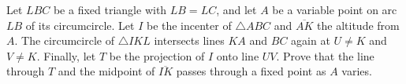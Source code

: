 Let $LBC$ be a fixed triangle with $LB=LC$, and let $A$ be a variable point on arc $LB$ of its circumcircle. Let $I$ be the incenter of $\triangle{ABC}$ and $\overline{AK}$ the altitude from $A$. The circumcircle of $\triangle{IKL}$ intersects lines $KA$ and $BC$ again at $U\neq K$ and $V\neq K$. Finally, let $T$ be the projection of $I$ onto line $UV$. Prove that the line through $T$ and the midpoint of $\overline{IK}$ passes through a fixed point as $A$ varies.